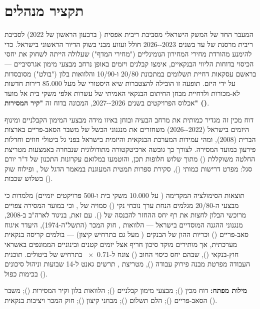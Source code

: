 \documentclass[12pt,a4paper,oneside]{book}
\begin{document}
\chapter*{תקציר מנהלים}

המעבר החד של המשק הישראלי מסביבת ריבית אפסית ( ברבעון הראשון של \num{2022}) לסביבת ריבית מרסנת של  עד  בשנים \num{2023--2026} חולל זעזוע מבני בשוק הדיור הראשוני בישראל. כדי להימנע מהורדת מחירי המחירון הנומינליים ("מחירי המדף") שעלולה הייתה לשחוק את יחסי הכיסוי בדוחות הליווי הבנקאיים, אימצו קבלנים ויזמים באופן נרחב מבצעי מימון אגרסיביים --- בראשם עסקאות דחיית תשלומים במתכונת \num{20/80} ו-\num{10/90} והלוואות בלון ("בולט") מסובסדות על ידי היזם. תופעה זו הובילה להצטברות שיא היסטורי של מעל \num{85,000} דירות חדשות לא-מכורות ולדחיית מבחן החיתום הבנקאי האמיתי של עשרות אלפי משקי בית אל מועד אכלוס הפרויקטים בשנים \num{2026--2027}, המכונה בדוח זה \textbf{"קיר המסירות" ()}.

דוח מכין זה מגדיר כמותית את מרחב הבעיה ובוחן באיזו מידה מבצעי המימון הקבלניים ומינוף היזמים בישראל (\num{2022--2026}) משחזרים את מנגנוני הכשל של משבר הסאב-פריים בארצות הברית (\num{2008}), ומהי עמידות המערכת הבנקאית והיזמית בישראל בפני גל ביטולי חוזים וחדלות פירעון במועד המסירה. לצורך כך גובשה ארכיטקטורה מתודולוגית שנבחרה באמצעות מטריצת החלטה משוקללת () מתוך שלוש חלופות תכן, והוטמעו במלואם עקרונות התכנון של ד"ר יורם סגל: מפרט דרישות כמותי (), סקירת ספרות תמטית המעוגנת במאמר הדגל של , ופילוח שוק בשלוש שכבות ().

תוצאות הסימולציה המקדימה ( על \num{10,000} משקי בית ו-\num{500} פרויקטים יזמיים) מלמדות כי מבצעי ה-\num{20/80} מגלמים הנחת ערך נוכחי נקי () סמויה של , וכי במועד המסירה צפויים  מרוכשי הבלון לחצות את רף יחס ההחזר להכנסה של  (). עם זאת, בניגוד לארה"ב ב-\num{2008}, מנגנוני ההגנה המוסדיים בישראל --- הלוואות , חוק המכר (התשל"ה-\num{1974}), היעדר איגוח סאב-פריים () וכריות ההון של הבנקים ( מעל  גם בתרחיש קיצון) --- בולמים קריסה בנקאית מערכתית, אך מותירים מוקד סיכון חריף אצל יזמים קטנים ובינוניים הממונפים באשראי חוץ-בנקאי (), שבהם יחס כיסוי החוב () צונח ל-\num{0.71x} בתרחיש של  ביטולים. תוכנית העבודה מפרטת מבנה פירוק עבודה (), מטריצת , תרשים גאנט ל-\num{14} שבועות וניהול סיכונים בכימות כפול ().

\vspace{0.4cm}
\noindent\textbf{מילות מפתח:} דוח מכין (); מבצעי מימון קבלניים (); הלוואות בלון וקיר המסירות (); משבר הסאב-פריים (); הלם תשלום (); מבחני קיצון (); חוק המכר ויציבות בנקאית ().
\end{document}
